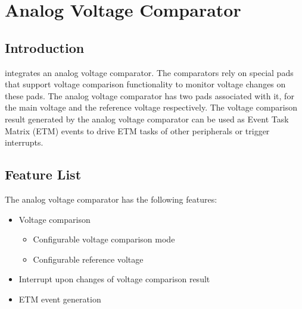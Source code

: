 \documentclass[main\_\_EN.tex]{subfiles}
\begin{document}

\ifglobal
\else
    \listoftodos
    {\let\clearpage\relax \listofdonetodos}
    \tableofcontents
\fi



\hypertarget{anacom}{}
\chapter{Analog Voltage Comparator}
\label{mod:anacom}



\section{Introduction}

\chipname{} integrates an analog voltage comparator. The comparators rely on special pads that support voltage comparison functionality to monitor voltage changes on these pads. The analog voltage comparator has two pads associated with it, for the main voltage and the reference voltage respectively. The voltage comparison result generated by the analog voltage comparator can be used as Event Task Matrix (ETM) events to drive ETM tasks of other peripherals or trigger interrupts.



\section{Feature List}
\label{sec:anacom-features}

The analog voltage comparator has the following features:

\begin{itemize}
    \item Voltage comparison
    \begin{itemize}
        \item Configurable voltage comparison mode
        \item Configurable reference voltage
    \end{itemize}
    \item Interrupt upon changes of voltage comparison result
    \item ETM event generation
\end{itemize}
\end{document}
